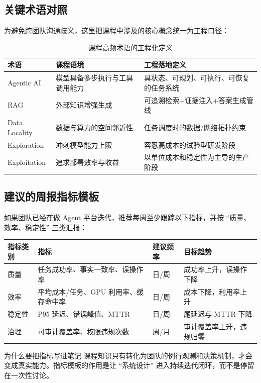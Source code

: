 \documentclass[a4paper]{article}
\begin{document}
\subsection{关键术语对照}
为避免跨团队沟通歧义，这里把课程中涉及的核心概念统一为工程口径：
\begin{table}[H]
\centering
\begin{tabular}{p{2.6cm}p{4.0cm}p{4.4cm}}
\toprule
\textbf{术语} & \textbf{课程语境} & \textbf{工程落地定义} \\
\midrule
Agentic AI & 模型具备多步执行与工具调用能力 & 具状态、可规划、可执行、可恢复的任务系统 \\
RAG & 外部知识增强生成 & 可追溯检索+证据注入+答案生成管线 \\
Data Locality & 数据与算力的空间邻近性 & 任务调度时的数据/网络拓扑约束 \\
Exploration & 冲刺模型能力上限 & 容忍高成本的试验型研发阶段 \\
Exploitation & 追求部署效率与收益 & 以单位成本和稳定性为主导的生产阶段 \\
\bottomrule
\end{tabular}
\caption{课程高频术语的工程化定义}
\end{table}

\subsection{建议的周报指标模板}
如果团队已经在做 Agent 平台迭代，推荐每周至少跟踪以下指标，并按 ``质量、效率、稳定性'' 三类汇报：
\begin{longtable}{p{2.8cm}p{3.8cm}p{2.7cm}p{3.0cm}}
\toprule
\textbf{指标类别} & \textbf{指标} & \textbf{建议频率} & \textbf{目标趋势} \\
\midrule
质量 & 任务成功率、事实一致率、误操作率 & 日/周 & 成功率上升，误操作下降 \\
效率 & 平均成本/任务、GPU 利用率、缓存命中率 & 日/周 & 成本下降，利用率上升 \\
稳定性 & P95 延迟、错误峰值、MTTR & 日/周 & 尾延迟与 MTTR 下降 \\
治理 & 可审计覆盖率、权限违规次数 & 周/月 & 审计覆盖率上升，违规归零 \\
\bottomrule
\end{longtable}

\begin{knowledgebox}{为什么要把指标写进笔记}
课程知识只有转化为团队的例行观测和决策机制，才会变成真实能力。指标模板的作用是让 ``系统设计'' 进入持续迭代闭环，而不是停留在一次性讨论。
\end{knowledgebox}
\end{document}
